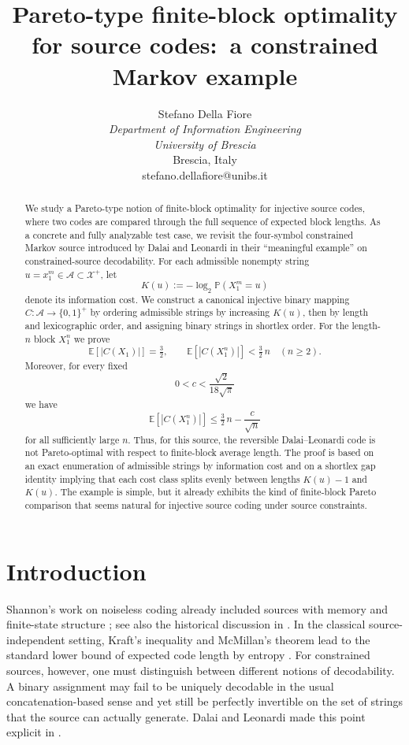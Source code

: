 \documentclass[10pt,a4paper]{article}
\title{Pareto-type finite-block optimality for source codes:\
a constrained Markov example}
\author{Stefano Della Fiore\\
\textit{Department of Information Engineering} \\
\textit{University of Brescia}\\
Brescia, Italy \\
stefano.dellafiore@unibs.it
}
\date{}
\theoremstyle{definition}
\theoremstyle{remark}
\newcommand{\1}{\mathbf{1}}
\newcommand{\PP}{\mathbb{P}}
\newcommand{\EE}{\mathbb{E}}
\begin{document}
\maketitle
 
\begin{abstract}
We study a Pareto-type notion of finite-block optimality for injective source codes, where two codes are compared through the full sequence of expected block lengths. As a concrete and fully analyzable test case, we revisit the four-symbol constrained Markov source introduced by Dalai and Leonardi in their ``meaningful example'' on constrained-source decodability. For each admissible nonempty string $u=x_1^m\in\mathcal A\subset\mathcal X^+$, let
\[
K(u):=-\log_2 \PP(X_1^m=u)
\]
denote its information cost. We construct a canonical injective binary mapping $C:\mathcal A\to\{0,1\}^+$ by ordering admissible strings by increasing $K(u)$, then by length and lexicographic order, and assigning binary strings in shortlex order. For the length-$n$ block $X_1^n$ we prove
\[
\EE[|C(X_1)|]=\tfrac32,
\qquad
\EE[|C(X_1^n)|]<\tfrac32\,n\quad (n\ge 2).
\]
Moreover, for every fixed
\[
0<c<\frac{\sqrt2}{18\sqrt\pi}
\]
we have
\[
\EE[|C(X_1^n)|]\le \tfrac32\,n-\frac{c}{\sqrt n}
\]
for all sufficiently large $n$. Thus, for this source, the reversible Dalai--Leonardi code is not Pareto-optimal with respect to finite-block average length. The proof is based on an exact enumeration of admissible strings by information cost and on a shortlex gap identity implying that each cost class splits evenly between lengths $K(u)-1$ and $K(u)$. The example is simple, but it already exhibits the kind of finite-block Pareto comparison that seems natural for injective source coding under source constraints.
\end{abstract}

\section{Introduction}
Shannon's work on noiseless coding already included sources with memory and finite-state structure \cite{Shannon48}; see also the historical discussion in \cite{Verdu98}. In the classical source-independent setting, Kraft's inequality and McMillan's theorem lead to the standard lower bound of expected code length by entropy \cite{Kraft49,McMillan56,CoverThomas,Gallager68}. For constrained sources, however, one must distinguish between different notions of decodability. A binary assignment may fail to be uniquely decodable in the usual concatenation-based sense and yet still be perfectly invertible on the set of strings that the source can actually generate. Dalai and Leonardi made this point explicit in \cite{DalaiLeonardi}.
\end{document}
